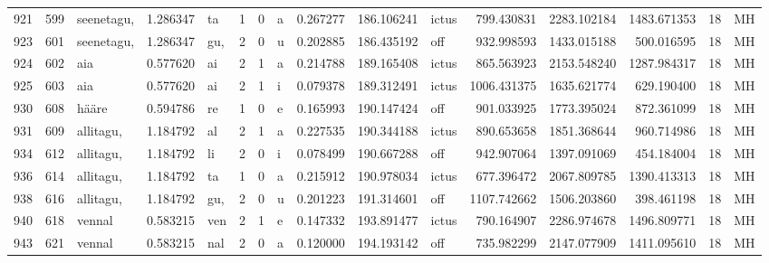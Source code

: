 \begin{tabular}{lrlrllllrrlrrrll}
921  &         599 &       seenetagu, &  1.286347 &      ta &        1 &      0 &       a &      0.267277 &    186.106241 &  ictus &   799.430831 &  2283.102184 &  1483.671353 &     18 &        MH \\
923  &         601 &       seenetagu, &  1.286347 &     gu, &        2 &      0 &       u &      0.202885 &    186.435192 &    off &   932.998593 &  1433.015188 &   500.016595 &     18 &        MH \\
924  &         602 &              aia &  0.577620 &      ai &        2 &      1 &       a &      0.214788 &    189.165408 &  ictus &   865.563923 &  2153.548240 &  1287.984317 &     18 &        MH \\
925  &         603 &              aia &  0.577620 &      ai &        2 &      1 &       i &      0.079378 &    189.312491 &  ictus &  1006.431375 &  1635.621774 &   629.190400 &     18 &        MH \\
930  &         608 &            hääre &  0.594786 &      re &        1 &      0 &       e &      0.165993 &    190.147424 &    off &   901.033925 &  1773.395024 &   872.361099 &     18 &        MH \\
931  &         609 &        allitagu, &  1.184792 &      al &        2 &      1 &       a &      0.227535 &    190.344188 &  ictus &   890.653658 &  1851.368644 &   960.714986 &     18 &        MH \\
934  &         612 &        allitagu, &  1.184792 &      li &        2 &      0 &       i &      0.078499 &    190.667288 &    off &   942.907064 &  1397.091069 &   454.184004 &     18 &        MH \\
936  &         614 &        allitagu, &  1.184792 &      ta &        1 &      0 &       a &      0.215912 &    190.978034 &  ictus &   677.396472 &  2067.809785 &  1390.413313 &     18 &        MH \\
938  &         616 &        allitagu, &  1.184792 &     gu, &        2 &      0 &       u &      0.201223 &    191.314601 &    off &  1107.742662 &  1506.203860 &   398.461198 &     18 &        MH \\
940  &         618 &           vennal &  0.583215 &     ven &        2 &      1 &       e &      0.147332 &    193.891477 &  ictus &   790.164907 &  2286.974678 &  1496.809771 &     18 &        MH \\
943  &         621 &           vennal &  0.583215 &     nal &        2 &      0 &       a &      0.120000 &    194.193142 &    off &   735.982299 &  2147.077909 &  1411.095610 &     18 &        MH \\

\end{tabular}
